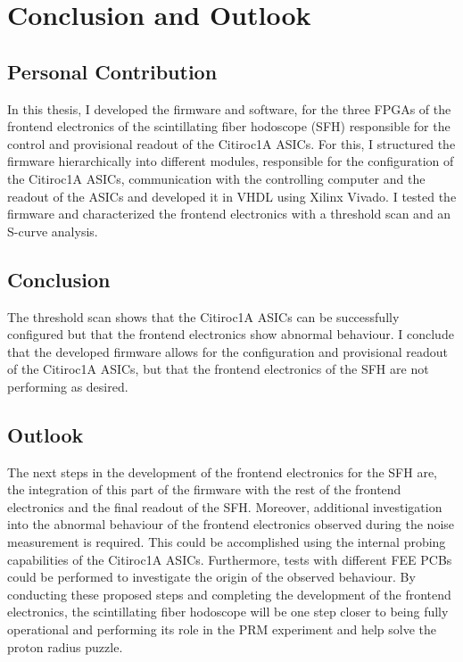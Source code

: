 \chapter{Conclusion and Outlook}
\noindent
\section{Personal Contribution}
In this thesis, I developed the firmware and software, 
for the three FPGAs of the frontend electronics of the scintillating fiber hodoscope (SFH) responsible for the control and provisional readout of the Citiroc1A ASICs.
\newline
For this, I structured the firmware hierarchically into different modules, responsible for the configuration of the Citiroc1A ASICs, communication with the controlling computer and the readout of the ASICs and developed it in VHDL using Xilinx Vivado.
\newline
I tested the firmware and characterized the frontend electronics with a threshold scan and an S-curve analysis.
\section{Conclusion}
The threshold scan shows that the Citiroc1A ASICs can be successfully configured but that the frontend electronics show abnormal behaviour.
I conclude that the developed firmware allows for the configuration and provisional readout of the Citiroc1A ASICs, 
but that the frontend electronics of the SFH are not performing as desired.

\section{Outlook}
The next steps in the development of the frontend electronics for the SFH are,
the integration of this part of the firmware with the rest of the frontend electronics and the final readout of the SFH.
Moreover, additional investigation into the abnormal behaviour of the frontend electronics observed during the noise measurement is required.
\newline
This could be accomplished using the internal probing capabilities of the Citiroc1A ASICs.
Furthermore, tests with different FEE PCBs could be performed to investigate the origin of the observed behaviour.
\newline
By conducting these proposed steps and completing the development of the frontend electronics,
the scintillating fiber hodoscope will be one step closer to being fully operational and performing its role in the PRM experiment and help solve the proton radius puzzle.
